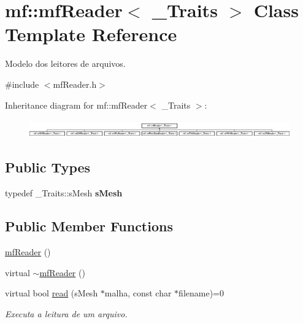 \hypertarget{classmf_1_1mfReader}{
\section{mf::mfReader$<$ \_\-Traits $>$ Class Template Reference}
\label{classmf_1_1mfReader}
}


Modelo dos leitores de arquivos.  




{\ttfamily \#include $<$mfReader.h$>$}

Inheritance diagram for mf::mfReader$<$ \_\-Traits $>$:\begin{figure}[H]
\begin{center}
\leavevmode
\includegraphics[height=0.776699cm]{classmf_1_1mfReader}
\end{center}
\end{figure}
\subsection*{Public Types}
\begin{DoxyCompactItemize}
\item 
\hypertarget{classmf_1_1mfReader_adbfe30c978c75ac98182d644b1b24752}{
typedef \_\-Traits::sMesh {\bfseries sMesh}}
\label{classmf_1_1mfReader_adbfe30c978c75ac98182d644b1b24752}

\end{DoxyCompactItemize}
\subsection*{Public Member Functions}
\begin{DoxyCompactItemize}
\item 
\hyperlink{classmf_1_1mfReader_a89a276eec0dbdb75a7985f894008959b}{mfReader} ()
\item 
virtual \hyperlink{classmf_1_1mfReader_ab0000ca6770e8bff2ea46fec0fb8b83e}{$\sim$mfReader} ()
\item 
virtual bool \hyperlink{classmf_1_1mfReader_a0e0c3224a06b06a8fb82be4f0f4a2e00}{read} (sMesh $\ast$malha, const char $\ast$filename)=0
\begin{DoxyCompactList}\small\item\em Executa a leitura de um arquivo. \item\end{DoxyCompactList}\end{DoxyCompactItemize}



